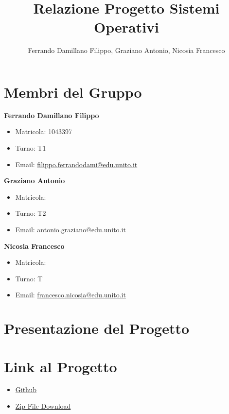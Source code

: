 \documentclass{article}
\title{Relazione Progetto Sistemi Operativi}
\author{Ferrando Damillano Filippo, Graziano Antonio, Nicosia Francesco}
\begin{document}
\maketitle

\tableofcontents

\section{Membri del Gruppo}

\textbf{Ferrando Damillano Filippo}
\begin{itemize}
    \item Matricola: 1043397
    \item Turno: T1    
    \item Email: \href{mailto:filippo.ferrandodami@edu.unito.it}{filippo.ferrandodami@edu.unito.it}
\end{itemize}

\textbf{Graziano Antonio}
\begin{itemize}
    \item Matricola:
    \item Turno: T2
    \item Email: \href{mailto:antonio.graziano@edu.unito.it}{antonio.graziano@edu.unito.it}     
\end{itemize}

\textbf{Nicosia Francesco}
\begin{itemize}
    \item Matricola: 
    \item Turno: T
    \item Email: \href{mailto:francesco.nicosia@edu.unito.it}{francesco.nicosia@edu.unito.it}
\end{itemize}

\section{Presentazione del Progetto}

\section{Link al Progetto}
    \begin{itemize}
        \item \href{https://github.com/filippo-ferrando/progetto-so}{Github}
        \item \href{https://github.com/filippo-ferrando/progetto-so/archive/refs/heads/main.zip}{Zip File Download}
    \end{itemize}
\end{document}
